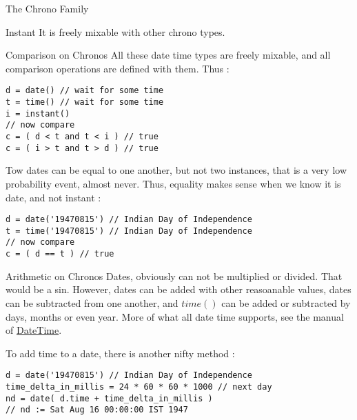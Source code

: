 \begin{section}{The Chrono Family}
\begin{subsection}{Instant}
It is freely mixable with other chrono types.

\end{subsection}


\begin{subsection}{Comparison on Chronos}
All these date time types are freely mixable, 
and all comparison operations are defined with them.
Thus :

\begin{lstlisting}[style=JexlStyle]
d = date() // wait for some time 
t = time() // wait for some time 
i = instant()
// now compare 
c = ( d < t and t < i ) // true 
c = ( i > t and t > d ) // true 
\end{lstlisting}

Tow dates can be equal to one another, but not two instances,
that is a very low probability event, almost never.
Thus, equality makes sense when we know it is date, and not instant :

\begin{center}\begin{minipage}{\linewidth}
\begin{lstlisting}[style=JexlStyle]
d = date('19470815') // Indian Day of Independence  
t = time('19470815') // Indian Day of Independence  
// now compare 
c = ( d == t ) // true 
\end{lstlisting}
\end{minipage}\end{center}

\end{subsection}

\begin{subsection}{Arithmetic on Chronos}
Dates, obviously can not be multiplied or divided.
That would be a sin. However, dates can be added with other reasoanable values, 
dates can be subtracted from one another, and $time()$ can be added or subtracted by days, months or even year.
More of what all date time supports, 
see the manual of \href{http://joda-time.sourceforge.net/apidocs/org/joda/time/DateTime.html}{DateTime}.

To add time to a date, there is another nifty method :

\begin{lstlisting}[style=JexlStyle]
d = date('19470815') // Indian Day of Independence  
time_delta_in_millis = 24 * 60 * 60 * 1000 // next day 
nd = date( d.time + time_delta_in_millis ) 
// nd := Sat Aug 16 00:00:00 IST 1947 
\end{lstlisting}


\end{subsection}
\end{section}
